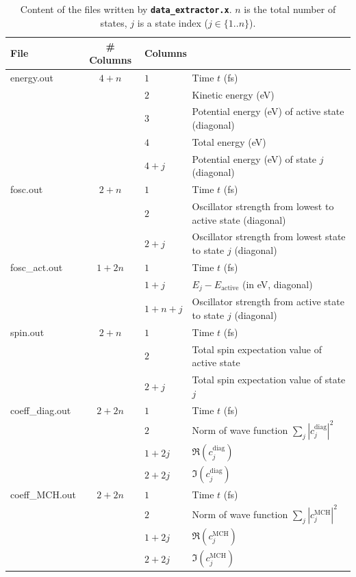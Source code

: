 \documentclass[a4paper,10pt,DIV=15,openany]{scrbook}
\newcommand{\ttt}[1]{\textbf{\texttt{#1}}}
\begin{document}
\begin{table}[tbp]
  \centering
  \caption[Content of the files written by \ttt{data\_extractor.x}.]{Content of the files written by \ttt{data\_extractor.x}. $n$ is the total number of states, $j$ is a state index ($j\in\{1..n\}$).}
  \label{tab:outputdata}
  \begin{tabular}{>{\ttfamily}lcll}
    \hline
    File  &\# Columns     &\multicolumn{2}{l}{Columns}\\
    \hline
    energy.out       &$4+n$
      &$1$ &Time $t$ (fs)\\
      &&$2$ &Kinetic energy (eV)\\
      &&$3$ &Potential energy (eV) of active state (diagonal)\\
      &&$4$ &Total energy (eV)\\
      &&$4+j$ &Potential energy (eV) of state $j$ (diagonal)\\
    fosc.out       &$2+n$
      &$1$ &Time $t$ (fs)\\
      &&$2$ &Oscillator strength from lowest to active state (diagonal)\\
      &&$2+j$ &Oscillator strength from lowest state to state $j$ (diagonal)\\
    fosc\_act.out       &$1+2n$
      &$1$ &Time $t$ (fs)\\
      &&$1+j$ &$E_j-E_\text{active}$ (in eV, diagonal)\\
      &&$1+n+j$ &Oscillator strength from active state to state $j$ (diagonal)\\
    spin.out       &$2+n$
      &$1$ &Time $t$ (fs)\\
      &&$2$ &Total spin expectation value of active state\\
      &&$2+j$ &Total spin expectation value of state $j$\\
    coeff\_diag.out       &$2+2n$
      &$1$ &Time $t$ (fs)\\
      &&$2$ &Norm of wave function $\sum_j |c_j^{\text{diag}}|^2$\\
      &&$1+2j$ &$\Re (c_j^{\text{diag}})$\\
      &&$2+2j$ &$\Im (c_j^{\text{diag}})$\\
    coeff\_MCH.out       &$2+2n$
      &$1$ &Time $t$ (fs)\\
      &&$2$ &Norm of wave function $\sum_j |c_j^{\text{MCH}}|^2$\\
      &&$1+2j$ &$\Re (c_j^{\text{MCH}})$\\
      &&$2+2j$ &$\Im (c_j^{\text{MCH}})$\\

\end{tabular}
\end{table}
\end{document}
